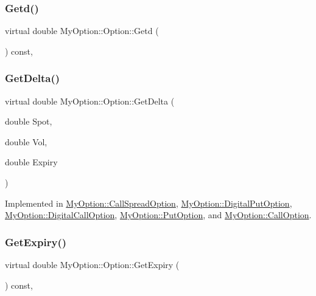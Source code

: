 \subsubsection{\texorpdfstring{Getd()}{Getd()}}
{\footnotesize\ttfamily virtual double My\+Option\+::\+Option\+::\+Getd (\begin{DoxyParamCaption}{ }\end{DoxyParamCaption}) const\hspace{0.3cm}{\ttfamily [inline]}, {\ttfamily [virtual]}}

\hypertarget{classMyOption_1_1Option_a4947bde99bb5e46b79aa0f36fd353d9b}{}\label{classMyOption_1_1Option_a4947bde99bb5e46b79aa0f36fd353d9b} 
\subsubsection{\texorpdfstring{Get\+Delta()}{GetDelta()}}
{\footnotesize\ttfamily virtual double My\+Option\+::\+Option\+::\+Get\+Delta (\begin{DoxyParamCaption}\item[{double}]{Spot,  }\item[{double}]{Vol,  }\item[{double}]{Expiry }\end{DoxyParamCaption})\hspace{0.3cm}{\ttfamily [pure virtual]}}



Implemented in \hyperlink{classMyOption_1_1CallSpreadOption_a4655116155bf4551129eda47625acef0}{My\+Option\+::\+Call\+Spread\+Option}, \hyperlink{classMyOption_1_1DigitalPutOption_a20e33b1b8a221ea2200fd08f3c691c4a}{My\+Option\+::\+Digital\+Put\+Option}, \hyperlink{classMyOption_1_1DigitalCallOption_a58446219e938256d1f451930350737b7}{My\+Option\+::\+Digital\+Call\+Option}, \hyperlink{classMyOption_1_1PutOption_a7a248fe90a32f48e52e81dff2d11a40d}{My\+Option\+::\+Put\+Option}, and \hyperlink{classMyOption_1_1CallOption_a46b6e6aa7b12967b825f50ec66911e51}{My\+Option\+::\+Call\+Option}.

\hypertarget{classMyOption_1_1Option_a15ca3c97b0cdcdb1e2ab424243fcabb3}{}\label{classMyOption_1_1Option_a15ca3c97b0cdcdb1e2ab424243fcabb3} 
\subsubsection{\texorpdfstring{Get\+Expiry()}{GetExpiry()}}
{\footnotesize\ttfamily virtual double My\+Option\+::\+Option\+::\+Get\+Expiry (\begin{DoxyParamCaption}{ }\end{DoxyParamCaption}) const\hspace{0.3cm}{\ttfamily [inline]}, {\ttfamily [virtual]}}

